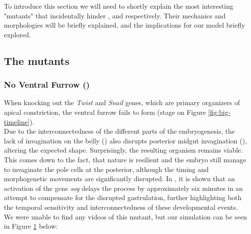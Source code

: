 
To introduce this section we will need to shortly explain the most interesting "mutants" that incidentally hinder ,  and  respectively. Their mechanics and morphologies will be briefly explained, and the implications for our model briefly explored. 

\subsection{The mutants}


\subsubsection{No Ventral Furrow ()}
When knocking out the \textit{Twist} and \textit{Snail} genes, which are primary organizers of apical constriction, the ventral furrow fails to form (stage  on Figure \ref{fig:big-timeline}).\cite{leptin1991twist} \\

Due to the interconnectedness of the different parts of the embryogenesis, the lack of invagination on the belly () also disrupts posterior midgut invagination (), altering the expected shape. Surprisingly, the resulting organism remains viable.\cite{conte2012biomechanical} This comes down to the fact, that nature is resilient and the embryo still manage to invaginate the pole cells at the posterior, although the timing and morphogenetic movements are significantly disrupted. In , it is shown that an activation of the gene \textit{sog} delays the process by approximately six minutes in an attempt to compensate for the disrupted gastrulation, further highlighting both the temporal sensitivity and interconnectedness of these developmental events.\\

We were unable to find any videos of this mutant, but our simulation can be seen in Figure \ref{fig:VFmutant} below:

\begin{figure}[H]
    \centering

    \caption{}
    \label{fig:VFmutant}
\end{figure}


